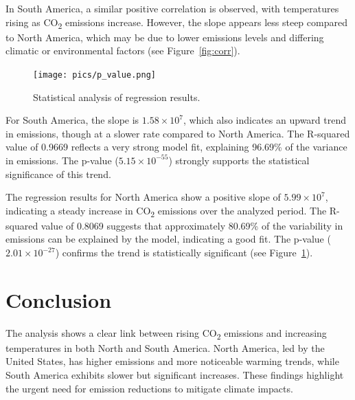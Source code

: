 \documentclass[a4paper,11pt]{article}
\begin{document}
\noindent
In South America, a similar positive correlation is observed, with temperatures rising as CO\textsubscript{2} emissions increase. However, the slope appears less steep compared to North America, which may be due to lower emissions levels and differing climatic or environmental factors (see Figure~\ref{fig:corr}).

\begin{figure}[htbp]
    \centering
    \texttt{[image: pics/p\_value.png]} 
    \caption{Statistical analysis of regression results.}
    \label{fig:regression-results}
\end{figure}

\noindent
For South America, the slope is \(1.58 \times 10^7\), which also indicates an upward trend in emissions, though at a slower rate compared to North America. The R-squared value of 0.9669 reflects a very strong model fit, explaining 96.69\% of the variance in emissions. The p-value (\(5.15 \times 10^{-55}\)) strongly supports the statistical significance of this trend.

\noindent
The regression results for North America show a positive slope of \(5.99 \times 10^7\), indicating a steady increase in CO\textsubscript{2} emissions over the analyzed period. The R-squared value of 0.8069 suggests that approximately 80.69\% of the variability in emissions can be explained by the model, indicating a good fit. The p-value (\(2.01 \times 10^{-27}\)) confirms the trend is statistically significant (see Figure~\ref{fig:regression-results}).


\section{Conclusion}

The analysis shows a clear link between rising CO\textsubscript{2} emissions and increasing temperatures in both North and South America. North America, led by the United States, has higher emissions and more noticeable warming trends, while South America exhibits slower but significant increases. These findings highlight the urgent need for emission reductions to mitigate climate impacts.
\end{document}
